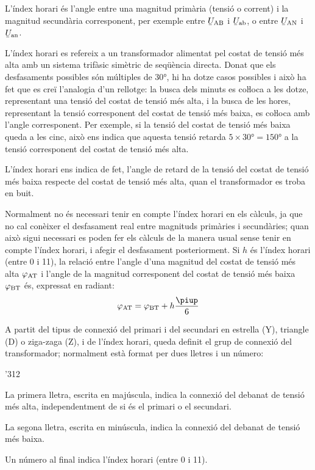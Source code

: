 L'índex horari és l'angle entre una magnitud  primària (tensió o corrent) i la magnitud secundària corresponent, per exemple entre $\cmplx{U}\ped{AB}$ i $\cmplx{U}\ped{ab}$, o entre $\cmplx{U}\ped{AN}$ i $\cmplx{U}\ped{an}$.

L'índex horari es refereix a un transformador alimentat pel costat de tensió més alta  amb un sistema trifàsic simètric de seqüència directa. Donat que els desfasaments possibles són múltiples de \ang{30}, hi ha dotze casos possibles i això ha fet que es creï l'analogia d'un rellotge: la busca dels minuts es coŀloca a les dotze, representant una tensió del costat de tensió més alta, i la busca de les hores, representant la tensió corresponent del costat de tensió més baixa, es coŀloca amb l'angle corresponent. Per exemple, si la tensió del costat de tensió més baixa queda a les cinc, això ens indica que aquesta tensió retarda $5\times \ang{30}= \ang{150}$ a la tensió corresponent del costat de tensió més alta.

L'índex horari ens indica de fet, l'angle de retard de la tensió del costat de tensió més baixa respecte del costat de tensió més alta, quan el transformador es troba en buit.

Normalment no és necessari tenir en compte l'índex horari en els càlculs, ja que no cal conèixer el desfasament real entre magnituds primàries i secundàries; quan això sigui necessari es poden fer els càlculs de la manera usual sense tenir en compte l'índex horari, i afegir el desfasament posteriorment. Si $h$ és l'índex horari (entre 0 i 11), la relació entre l'angle d'una magnitud del costat de tensió més alta $\varphi_\mathrm{AT}$ i l'angle de la magnitud corresponent del costat de tensió més baixa $\varphi_\mathrm{BT}$ és, expressat en radiant:
\begin{equation}
    \varphi\ped{AT} = \varphi\ped{BT} + h\frac{\piup}{6}\label{eq:fi-AT-BT}
\end{equation}


A partit del tipus de connexió del primari i del secundari en estrella (Y), triangle (D) o ziga-zaga (Z), i de l'índex horari, queda definit el grup de connexió del transformador; normalment està format per dues lletres i un número:
\begin{dingautolist}{'312}
   \item La primera lletra, escrita en majúscula, indica la connexió del debanat de tensió més alta, independentment de si és el primari o el secundari.
   \item La segona lletra, escrita en minúscula, indica la connexió del debanat de tensió més baixa.
   \item Un número al final indica l'índex horari (entre 0 i 11).
\end{dingautolist}


